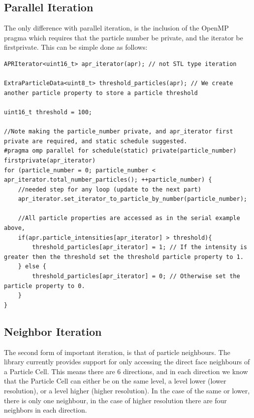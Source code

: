 \documentclass[12pt]{article}
\begin{document}
\subsection{Parallel Iteration}
The only difference with parallel iteration, is the inclusion of the OpenMP pragma which requires that the particle number be private, and the iterator be firstprivate. This can be simple done as follows:
\begin{lstlisting}
APRIterator<uint16_t> apr_iterator(apr); // not STL type iteration

ExtraParticleData<uint8_t> threshold_particles(apr); // We create another particle property to store a particle threshold

uint16_t threshold = 100;

//Note making the particle_number private, and apr_iterator first private are required, and static schedule suggested.
#pragma omp parallel for schedule(static) private(particle_number) firstprivate(apr_iterator)
for (particle_number = 0; particle_number < apr_iterator.total_number_particles(); ++particle_number) {
	//needed step for any loop (update to the next part)
	apr_iterator.set_iterator_to_particle_by_number(particle_number);

	//All particle properties are accessed as in the serial example above,
	if(apr.particle_intensities[apr_iterator] > threshold){
		threshold_particles[apr_iterator] = 1; // If the intensity is greater then the threshold set the threshold particle property to 1.
	} else {
		threshold_particles[apr_iterator] = 0; // Otherwise set the particle property to 0.
	}
}
\end{lstlisting}
\subsection{Neighbor Iteration}
The second form of important iteration, is that of particle neighbours. The library currently provides support for only accessing the direct face neighbours of a Particle Cell. This means there are 6 directions, and in each direction we know that the Particle Cell can either be on the same level, a level lower (lower resolution), or a level higher (higher resolution). In the case of the same or lower, there is only one neighbour, in the case of higher resolution there are four neighbors in each direction.
\end{document}
